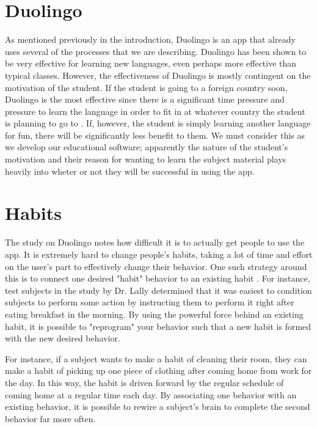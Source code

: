\section{Duolingo}
As mentioned previously in the introduction, Duolingo is an app that already uses several of the processes that we are describing. Duolingo has been shown to be very effective for learning new languages, even perhaps more effective than typical classes. However, the effectiveness of Duolingo is mostly contingent on the motivation of the student. If the student is going to a foreign country soon, Duolingo is the most effective since there is a significant time pressure and pressure to learn the language in order to fit in at whatever country the student is planning to go to \cite{vesselinov2012duolingo}. If, however, the student is simply learning another language for fun, there will be significantly less benefit to them. We must consider this as we develop our educational software; apparently the nature of the student's motivation and their reason for wanting to learn the subject material plays heavily into wheter or not they will be successful in using the app.

\section{Habits}
The study on Duolingo notes how difficult it is to actually get people to use the app. It is extremely hard to change people's habits, taking a lot of time and effort on the user's part to effectively change their behavior. One such strategy around this is to connect one desired "habit" behavior to an existing habit \cite{lally2010habits}. For instance, test subjects in the study by Dr. Lally determined that it was easiest to condition subjects to perform some action by instructing them to perform it right after eating breakfast in the morning. By using the powerful force behind an existing habit, it is possible to "reprogram" your behavior such that a new habit is formed with the new desired behavior.

For instance, if a subject wants to make a habit of cleaning their room, they can make a habit of picking up one piece of clothing after coming home from work for the day. In this way, the habit is driven forward by the regular schedule of coming home at a regular time each day. By associating one behavior with an existing behavior, it is possible to rewire a subject's brain to complete the second behavior far more often.

